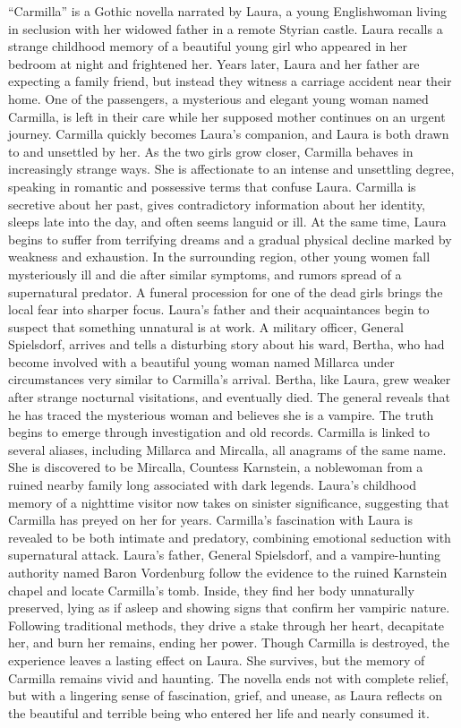 \documentclass{article} %
\begin{document}
``Carmilla'' is a Gothic novella narrated by Laura, a young Englishwoman living in seclusion with her widowed father in a remote Styrian castle. Laura recalls a strange childhood memory of a beautiful young girl who appeared in her bedroom at night and frightened her. Years later, Laura and her father are expecting a family friend, but instead they witness a carriage accident near their home. One of the passengers, a mysterious and elegant young woman named Carmilla, is left in their care while her supposed mother continues on an urgent journey. Carmilla quickly becomes Laura’s companion, and Laura is both drawn to and unsettled by her. As the two girls grow closer, Carmilla behaves in increasingly strange ways. She is affectionate to an intense and unsettling degree, speaking in romantic and possessive terms that confuse Laura. Carmilla is secretive about her past, gives contradictory information about her identity, sleeps late into the day, and often seems languid or ill. At the same time, Laura begins to suffer from terrifying dreams and a gradual physical decline marked by weakness and exhaustion. In the surrounding region, other young women fall mysteriously ill and die after similar symptoms, and rumors spread of a supernatural predator. A funeral procession for one of the dead girls brings the local fear into sharper focus. Laura’s father and their acquaintances begin to suspect that something unnatural is at work. A military officer, General Spielsdorf, arrives and tells a disturbing story about his ward, Bertha, who had become involved with a beautiful young woman named Millarca under circumstances very similar to Carmilla’s arrival. Bertha, like Laura, grew weaker after strange nocturnal visitations, and eventually died. The general reveals that he has traced the mysterious woman and believes she is a vampire. The truth begins to emerge through investigation and old records. Carmilla is linked to several aliases, including Millarca and Mircalla, all anagrams of the same name. She is discovered to be Mircalla, Countess Karnstein, a noblewoman from a ruined nearby family long associated with dark legends. Laura’s childhood memory of a nighttime visitor now takes on sinister significance, suggesting that Carmilla has preyed on her for years. Carmilla’s fascination with Laura is revealed to be both intimate and predatory, combining emotional seduction with supernatural attack. Laura’s father, General Spielsdorf, and a vampire-hunting authority named Baron Vordenburg follow the evidence to the ruined Karnstein chapel and locate Carmilla’s tomb. Inside, they find her body unnaturally preserved, lying as if asleep and showing signs that confirm her vampiric nature. Following traditional methods, they drive a stake through her heart, decapitate her, and burn her remains, ending her power. Though Carmilla is destroyed, the experience leaves a lasting effect on Laura. She survives, but the memory of Carmilla remains vivid and haunting. The novella ends not with complete relief, but with a lingering sense of fascination, grief, and unease, as Laura reflects on the beautiful and terrible being who entered her life and nearly consumed it.
\end{document}

